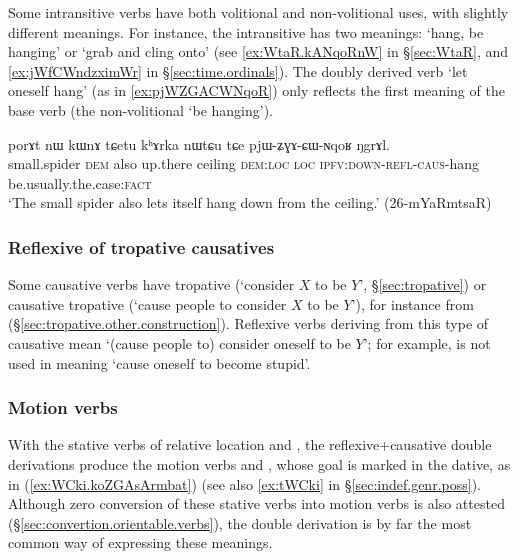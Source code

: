 Some intransitive verbs have both volitional and non-volitional uses, with slightly different meanings. For instance, the intransitive  has two meanings: `hang, be hanging' or `grab and cling onto' (see \ref{ex:WtaR.kANqoRnW} in §\ref{sec:WtaR}, and \ref{ex:jWfCWndzximWr} in §\ref{sec:time.ordinals}). The doubly derived verb  `let oneself hang' (as in \ref{ex:pjWZGACWNqoR}) only reflects the first meaning of the base verb  (the non-volitional `be hanging').
\largerpage
\begin{exe}
\ex \label{ex:pjWZGACWNqoR}
\gll  porɤt nɯ kɯnɤ tɕetu kʰɤrka nɯtɕu tɕe pjɯ-ʑɣɤ-ɕɯ-ɴqoʁ ŋgrɤl. \\
small.spider \textsc{dem} also up.there ceiling \textsc{dem}:\textsc{loc} \textsc{loc} \textsc{ipfv}:\textsc{down}-\textsc{refl}-\textsc{caus}-hang be.usually.the.case:\textsc{fact} \\
\glt `The small spider also lets itself hang down from the ceiling.' (26-mYaRmtsaR) 
 \end{exe}
 
 

% 
 
 
 
\subsubsection{Reflexive of tropative causatives} \label{sec:refl.trop.caus}
Some causative verbs have tropative (`consider $X$ to be $Y$', §\ref{sec:tropative}) or causative tropative (`cause people to consider $X$ to be $Y$'), for instance  from  (§\ref{sec:tropative.other.construction}). Reflexive verbs deriving from this type of causative mean `(cause people to) consider oneself to be $Y$'; for example,  is not used in meaning `cause oneself to become stupid'.
 
 
 \subsubsection{Motion verbs} \label{sec:refl.caus.motion}
    
With the stative verbs of relative location  and  , the reflexive+causative double derivations produce the motion verbs  and , whose goal is marked in the dative, as in (\ref{ex:WCki.koZGAsArmbat}) (see also \ref{ex:tWCki} in §\ref{sec:indef.genr.poss}). Although zero conversion of these stative verbs into motion verbs is also attested (§\ref {sec:convertion.orientable.verbs}), the double derivation is by far the most common way of expressing these meanings.

